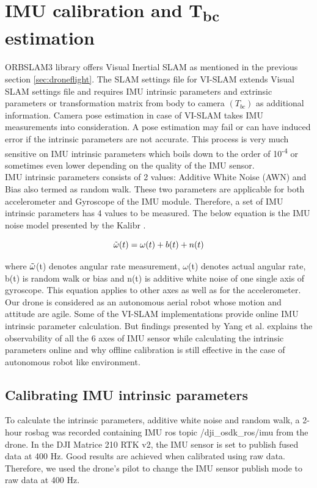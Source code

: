\section{IMU calibration and T\textsubscript{bc} estimation}
\label{sec:imucalib}
ORBSLAM3 library offers Visual Inertial SLAM as mentioned in the previous section \ref{sec:droneflight}. The SLAM settings file for VI-SLAM extends Visual SLAM settings file and requires IMU intrinsic parameters and extrinsic parameters or transformation matrix from body to camera \((T_{bc})\) as additional information. Camera pose estimation in case of VI-SLAM takes IMU measurements into consideration. A pose estimation may fail or can have induced error if the intrinsic parameters are not accurate. This process is very much sensitive on IMU intrinsic parameters which boils down to the order of 10\textsuperscript{-4} or sometimes even lower depending on the quality of the IMU sensor.\\

IMU intrinsic parameters consists of 2 values: Additive White Noise (AWN) and Bias also termed as random walk. These two parameters are applicable for both accelerometer and Gyroscope of the IMU module. Therefore, a set of IMU intrinsic parameters has 4 values to be measured. The below equation is the IMU noise model presented by the Kalibr \cite{Kalibr}.

\begin{equation}
    \Tilde{\omega}(t) = \omega(t) + b(t) + n(t) 
\end{equation}

where $\Tilde{\omega}$(t) denotes angular rate measurement, $\omega$(t) denotes actual angular rate, b(t) is random walk or bias and n(t) is additive white noise of one single axis of gyroscope. This equation applies to other axes as well as for the accelerometer. \\

Our drone is considered as an autonomous aerial robot whose motion and attitude are agile. Some of the VI-SLAM implementations provide online IMU intrinsic parameter calculation. But findings presented by Yang et al. \cite{Yang2020} explains the observability of all the 6 axes of IMU sensor while calculating the intrinsic parameters online and why offline calibration is still effective in the case of autonomous robot like environment.

\subsection*{Calibrating IMU intrinsic parameters}
To calculate the intrinsic parameters, additive white noise and random walk, a 2-hour rosbag was recorded containing IMU ros topic /dji\_osdk\_ros/imu from the drone. In the DJI Matrice 210 RTK v2, the IMU sensor is set to publish fused data at 400 Hz. Good results are achieved when calibrated using raw data. Therefore, we used the drone's pilot to change the IMU sensor publish mode to raw data at 400 Hz. 

